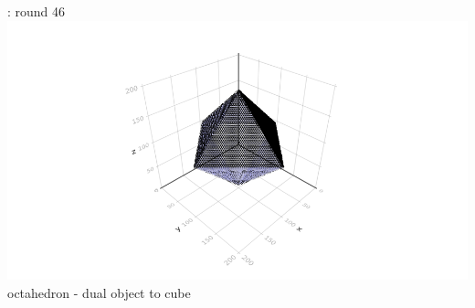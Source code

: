 \documentclass{beamer}
\begin{document}
\begin{frame}{\insertsubsection : round 46}
  \includegraphics[trim=5cm 0.7cm 5cm 3cm, clip, width=1\linewidth]{algorithm_visualisation/srgsteps/srgstep45.png}\\
  octahedron - dual object to cube\\
\end{frame}
\end{document}
